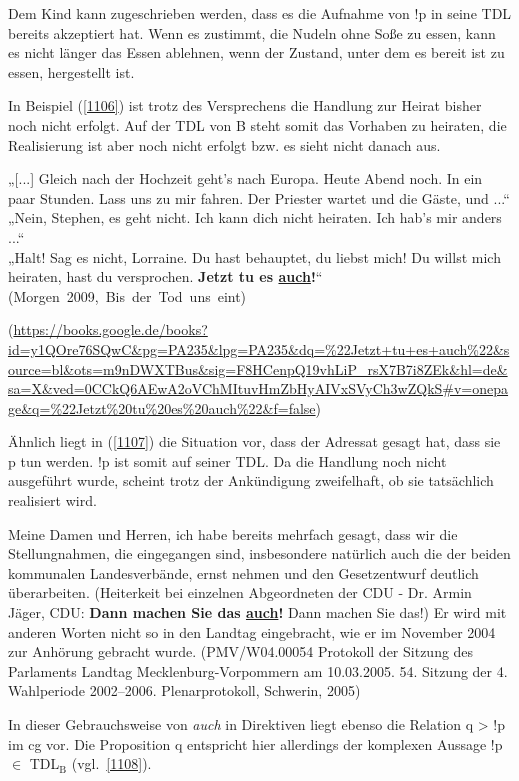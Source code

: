 \largerpage[2]\noindent
Dem Kind kann zugeschrieben werden, dass es die Aufnahme von !p in seine TDL bereits akzeptiert hat. Wenn es zustimmt, die Nudeln ohne Soße zu essen, kann es nicht länger das Essen ablehnen, wenn der Zustand, unter dem es bereit ist zu essen, hergestellt ist.

In Beispiel (\ref{1106}) ist trotz des Versprechens die Handlung zur Heirat bisher noch nicht erfolgt. Auf der TDL von B steht somit das Vorhaben zu heiraten, die Rea\-lisierung ist aber noch nicht erfolgt bzw. es sieht nicht danach aus.
	
\begin{exe}
	\ex\label{1106} 

 	„[...] Gleich nach der Hochzeit geht's nach Europa. Heute Abend noch. In ein paar Stunden. Lass uns
 	zu mir fahren. Der Priester wartet und die Gäste, und ...“\\
	„Nein, Stephen, es geht nicht. Ich kann dich nicht heiraten. Ich hab's mir anders ...“\\
	„Halt! Sag es nicht, Lorraine. Du hast behauptet, du liebst mich! Du willst mich heiraten, hast du versprochen. \textbf{Jetzt tu es 					\ul{auch}!}“\newline\hbox{}
	\hfill\hbox{(Morgen 2009, Bis der Tod uns eint)}				 
  	\begin{sloppypar}	{\scriptsize(\url{https://books.google.de/books?id=y1QOre76SQwC\&pg=PA235\&lpg=PA235\&dq=\%22Jetzt+tu+es+auch\%22\&source=bl\&ots=m9nDWXTBus\&sig=F8HCenpQ19vhLiP\_rsX7B7i8ZEk\&hl=de\&sa=X\&ved=0CCkQ6AEwA2oVChMItuvHmZbHyAIVxSVyCh3wZQkS\#v=onepage\&q=\%22Jetzt\%20tu\%20es\%20auch\%22\&f=false})}\end{sloppypar}
\end{exe}	
Ähnlich liegt in (\ref{1107}) die Situation vor, dass der Adressat gesagt hat, dass sie p tun werden. !p ist somit auf seiner TDL. Da die Handlung noch nicht ausgeführt wurde, scheint trotz der Ankündigung zweifelhaft, ob sie tatsächlich realisiert wird.
	
\begin{exe}
	\ex\label{1107} 

 	Meine Damen und Herren, ich habe bereits mehrfach gesagt, dass wir die Stellungnahmen, die eingegangen sind, insbesondere natürlich auch die der beiden 	kommunalen Landesverbände, ernst nehmen und den Gesetzentwurf deutlich überarbeiten. (Heiterkeit bei einzelnen Abgeordneten der CDU - Dr. Armin Jäger, 		CDU: \textbf{Dann machen Sie das \ul{auch}!} Dann machen Sie das!) Er wird mit anderen Worten nicht so in den Landtag eingebracht, wie er im 		November 2004 zur Anhörung gebracht wurde.	 	
	\newline
	(\textsc{PMV/W04.00054} Protokoll der Sitzung des Parlaments Landtag Meck\-len\-burg-Vor\-pom\-mern am 10.03.2005. 54. Sitzung der 4. Wahlperiode 2002--2006. Plenarprotokoll, Schwerin, 2005)
\end{exe}	
In dieser Gebrauchsweise von \textit{auch} in Direktiven liegt ebenso die Relation q > !p im cg vor. Die Proposition q entspricht hier allerdings der komplexen Aussage !p $\in$ TDL$_{\textrm{B}}$ (vgl.\ \ref{1108}).

